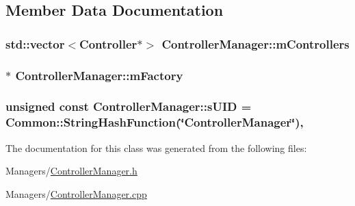\subsection{Member Data Documentation}
\subsubsection[{\texorpdfstring{m\+Controllers}{mControllers}}]{\setlength{\rightskip}{0pt plus 5cm}std\+::vector$<${\bf Controller}$\ast$$>$ Controller\+Manager\+::m\+Controllers\hspace{0.3cm}{\ttfamily [private]}}\hypertarget{classControllerManager_a6cf26f1ec8e699d09946f64035e7a799}{}\label{classControllerManager_a6cf26f1ec8e699d09946f64035e7a799}
\subsubsection[{\texorpdfstring{m\+Factory}{mFactory}}]{$\ast$ Controller\+Manager\+::m\+Factory\hspace{0.3cm}{\ttfamily [private]}}\hypertarget{classControllerManager_aaa89dac535e0fd52035040f2c7ab3e11}{}\label{classControllerManager_aaa89dac535e0fd52035040f2c7ab3e11}
\subsubsection[{\texorpdfstring{s\+U\+ID}{sUID}}]{\setlength{\rightskip}{0pt plus 5cm}unsigned const Controller\+Manager\+::s\+U\+ID = {\bf Common\+::\+String\+Hash\+Function}(\char`\"{}Controller\+Manager\char`\"{})\hspace{0.3cm}{\ttfamily [static]}, {\ttfamily [private]}}\hypertarget{classControllerManager_a3071df05318f3aac6047e98df59fdbf4}{}\label{classControllerManager_a3071df05318f3aac6047e98df59fdbf4}


The documentation for this class was generated from the following files\+:\begin{DoxyCompactItemize}
\item 
Managers/\hyperlink{ControllerManager_8h}{Controller\+Manager.\+h}\item 
Managers/\hyperlink{ControllerManager_8cpp}{Controller\+Manager.\+cpp}\end{DoxyCompactItemize}
